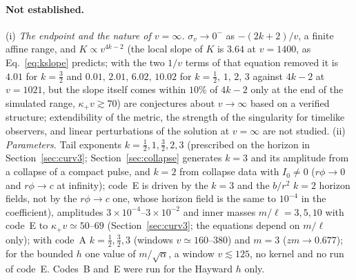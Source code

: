 \documentclass[11pt]{article}
\begin{document}
\paragraph{Not established.}
(i) \emph{The endpoint and the nature of $v=\infty$.} $\sigma_v\to0^{-}$ as $-(2k+2)/v$, a finite affine range, and $K\propto v^{4k-2}$ (the local slope of $K$ is $3.64$ at $v=1400$, as Eq.~\eqref{eq:kslope} predicts; with the two $1/v$ terms of that equation removed it is $4.01$ for $k=\tfrac32$ and $0.01,\,2.01,\,6.02,\,10.02$ for $k=\tfrac12,\,1,\,2,\,3$ against $4k-2$ at $v=1021$, but the slope itself comes within $10\%$ of $4k-2$ only at the end of the simulated range, $\kappa_+v\gtrsim70$) are conjectures about $v\to\infty$ based on a verified structure; extendibility of the metric, the strength of the singularity for timelike observers, and linear perturbations of the solution at $v=\infty$ are not studied.
(ii) \emph{Parameters.} Tail exponents $k=\tfrac12,1,\tfrac32,2,3$ (prescribed on the horizon in Section~\ref{sec:curv3}; Section~\ref{sec:collapse} generates $k=3$ and its amplitude from a collapse of a compact pulse, and $k=2$ from collapse data with $I_0\ne0$ ($r\phi\to0$ and $r\phi\to c$ at infinity); code~E is driven by the $k=3$ and the $b/r^{2}$ $k=2$ horizon fields, not by the $r\phi\to c$ one, whose horizon field is the same to $10^{-4}$ in the coefficient), amplitudes $3\times10^{-4}$--$3\times10^{-2}$ and inner masses $m/\ell=3,5,10$ with code~E to $\kappa_+v\simeq50$--$69$ (Section~\ref{sec:curv3}; the equations depend on $m/\ell$ only); with code~A $k=\tfrac12,\tfrac32,3$ (windows $v\simeq160$--$380$) and $m=3$ ($zm\to0.677$); for the bounded $h$ one value of $m/\sqrt\alpha$, a window $v\lesssim125$, no kernel and no run of code~E. Codes~B and~E were run for the Hayward $h$ only.
\end{document}
